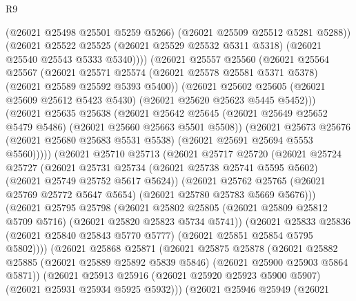 \begin{lexlean}{R9}
\begin{coremodule}
                (@26021 @25498 @25501 @5259 @5266)
                (@26021 @25509 @25512 @5281 @5288))
              (@26021
                @25522
                @25525
                (@26021 @25529 @25532 @5311 @5318)
                (@26021 @25540 @25543 @5333 @5340))))
          (@26021
            @25557
            @25560
            (@26021
              @25564
              @25567
              (@26021
                @25571
                @25574
                (@26021 @25578 @25581 @5371 @5378)
                (@26021 @25589 @25592 @5393 @5400))
              (@26021
                @25602
                @25605
                (@26021 @25609 @25612 @5423 @5430)
                (@26021 @25620 @25623 @5445 @5452)))
            (@26021
              @25635
              @25638
              (@26021
                @25642
                @25645
                (@26021 @25649 @25652 @5479 @5486)
                (@26021 @25660 @25663 @5501 @5508))
              (@26021
                @25673
                @25676
                (@26021 @25680 @25683 @5531 @5538)
                (@26021 @25691 @25694 @5553 @5560)))))
        (@26021
          @25710
          @25713
          (@26021
            @25717
            @25720
            (@26021
              @25724
              @25727
              (@26021
                @25731
                @25734
                (@26021 @25738 @25741 @5595 @5602)
                (@26021 @25749 @25752 @5617 @5624))
              (@26021
                @25762
                @25765
                (@26021 @25769 @25772 @5647 @5654)
                (@26021 @25780 @25783 @5669 @5676)))
            (@26021
              @25795
              @25798
              (@26021
                @25802
                @25805
                (@26021 @25809 @25812 @5709 @5716)
                (@26021 @25820 @25823 @5734 @5741))
              (@26021
                @25833
                @25836
                (@26021 @25840 @25843 @5770 @5777)
                (@26021 @25851 @25854 @5795 @5802))))
          (@26021
            @25868
            @25871
            (@26021
              @25875
              @25878
              (@26021
                @25882
                @25885
                (@26021 @25889 @25892 @5839 @5846)
                (@26021 @25900 @25903 @5864 @5871))
              (@26021
                @25913
                @25916
                (@26021 @25920 @25923 @5900 @5907)
                (@26021 @25931 @25934 @5925 @5932)))
            (@26021
              @25946
              @25949
              (@26021

\end{coremodule}
\end{lexlean}
